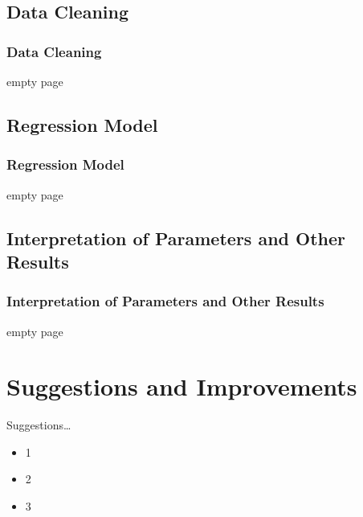 \documentclass{beamer}
\begin{document}
\subsection{Data Cleaning}
\begin{frame}[fragile]
\frametitle{Data Cleaning}


empty page

\end{frame}



\subsection{Regression Model}
\begin{frame}[fragile]
\frametitle{Regression Model}


empty page

\end{frame}


\subsection{Interpretation of Parameters and Other Results}
\begin{frame}[fragile]
\frametitle{Interpretation of Parameters and Other Results}

empty page

\end{frame}


\section{Suggestions and Improvements}
\begin{frame}{Suggestions\dots{}}

\begin{itemize}
\item 1
\item 2
\item 3
\end{itemize}

\end{frame}
\end{document}
